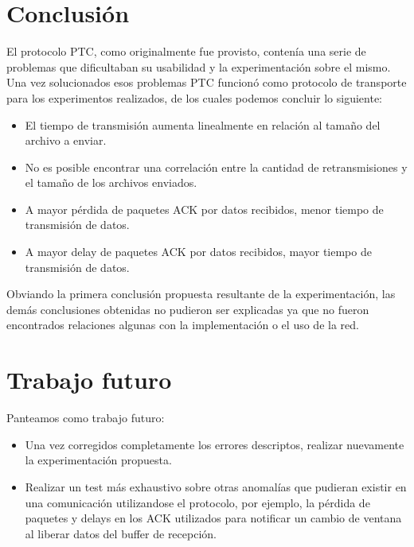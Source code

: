 \documentclass[a4paper, 10pt, twoside]{article}
\begin{document}


\section{Conclusión}

El protocolo PTC, como originalmente fue provisto, contenía una serie de problemas que dificultaban su usabilidad y la experimentación sobre el mismo. Una vez solucionados esos problemas PTC funcionó como protocolo de transporte para los experimentos realizados, de los cuales podemos concluir lo siguiente:

\begin{itemize}
  \item El tiempo de transmisión aumenta linealmente en relación al tamaño del archivo a enviar.
  \item No es posible encontrar una correlación entre la cantidad de retransmisiones y el tamaño de los archivos enviados.
  \item A mayor pérdida de paquetes ACK por datos recibidos, menor tiempo de transmisión de datos.
  \item A mayor delay de paquetes ACK por datos recibidos, mayor tiempo de transmisión de datos.
\end{itemize}

Obviando la primera conclusión propuesta resultante de la experimentación, las demás conclusiones obtenidas no pudieron ser explicadas ya que no fueron encontrados relaciones algunas con la implementación o el uso de la red.



\section{Trabajo futuro}

Panteamos como trabajo futuro:
\begin{itemize}
\item Una vez corregidos completamente los errores descriptos, realizar nuevamente la experimentación propuesta.
\item Realizar un test más exhaustivo sobre otras anomalías que pudieran existir en una comunicación utilizandose el protocolo, por ejemplo, la pérdida de paquetes y delays en los ACK utilizados para notificar un cambio de ventana al liberar datos del buffer de recepción.
\end{itemize}



\begin{thebibliography}{9}


\end{thebibliography}
\end{document}
